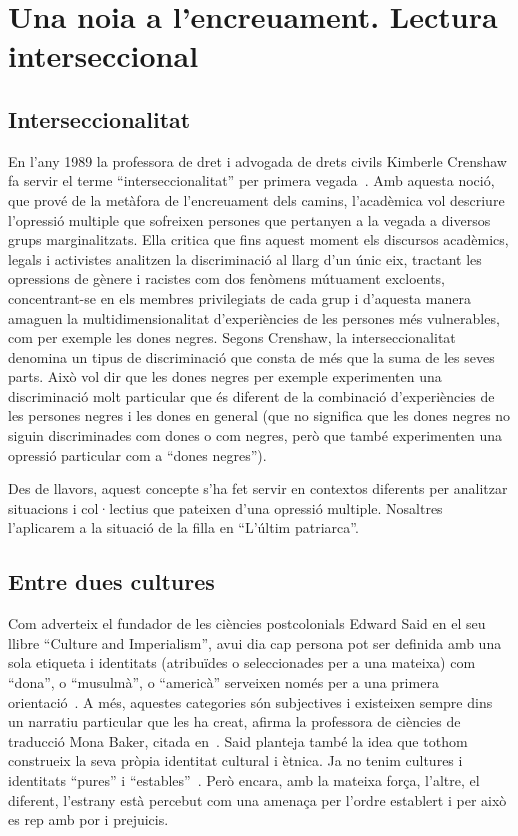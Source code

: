 \section{Una noia a l'encreuament. Lectura interseccional}

\subsection{Interseccionalitat}

En l'any 1989 la professora de dret i advogada de drets civils Kimberle Crenshaw fa servir el terme ``interseccionalitat'' per primera vegada~\autocite{Crenshaw1989}.
Amb aquesta noció, que prové de la metàfora de l'encreuament dels camins, l'acadèmica vol descriure l'opressió multiple que sofreixen persones que pertanyen a la vegada a diversos grups marginalitzats.
Ella critica que fins aquest moment els discursos acadèmics, legals i activistes analitzen la discriminació al llarg d'un únic eix,
tractant les opressions de gènere i racistes com dos fenòmens mútuament excloents,
concentrant-se en els membres privilegiats de cada grup i d'aquesta manera amaguen la multidimensionalitat d'experiències de les persones més vulnerables, com per exemple les dones negres.
Segons Crenshaw, la interseccionalitat denomina un tipus de discriminació que consta de més que la suma de les seves parts.
Això vol dir que les dones negres per exemple experimenten una discriminació molt particular que és diferent de la combinació d'experiències de les persones negres i les dones en general (que no significa que les dones negres no siguin discriminades com dones o com negres, però que també experimenten una opressió particular com a ``dones negres'').

Des de llavors, aquest concepte s'ha fet servir en contextos diferents per analitzar situacions i col·lectius que pateixen d'una opressió multiple.
Nosaltres l'aplicarem a la situació de la filla en ``L'últim patriarca''.

\subsection{Entre dues cultures}

Com adverteix el fundador de les ciències postcolonials Edward Said en el seu llibre ``Culture and Imperialism'', avui dia cap persona pot ser definida amb una sola etiqueta
i identitats (atribuïdes o seleccionades per a una mateixa) com ``dona'', o ``musulmà'', o ``americà'' serveixen només per a una primera orientació~\autocite{Vidal2012}.
A més, aquestes categories són subjectives i existeixen sempre dins un narratiu particular que les ha creat, afirma la professora de ciències de traducció Mona Baker, citada en~\autocite{Vidal2012}.
Said planteja també la idea que tothom construeix la seva pròpia identitat cultural i ètnica.
Ja no tenim cultures i identitats ``pures'' i ``estables''~\autocite{Vidal2012}.
Però encara, amb la mateixa força, l'altre, el diferent, l'estrany està percebut com una amenaça per l'ordre establert i per això es rep amb por i prejuicis.


